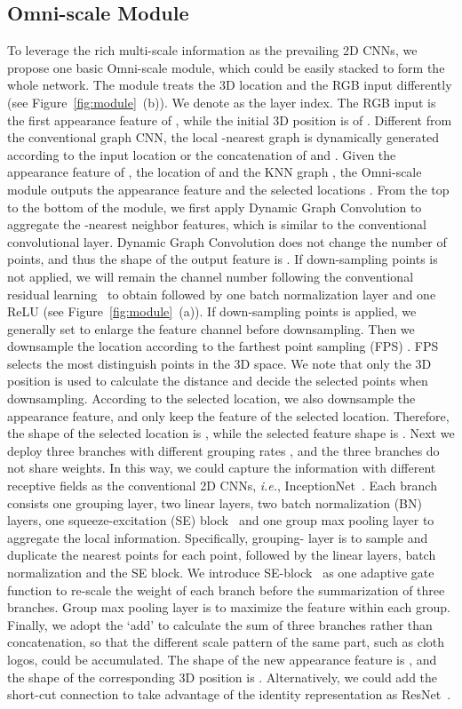 \documentclass[journal]{IEEEtran}
\def\ie{\emph{i.e.}}
\begin{document}
\subsection{Omni-scale Module}
To leverage the rich multi-scale information as the prevailing 2D CNNs, we propose one basic Omni-scale module, which could be easily stacked to form the whole network. The module treats the 3D location and the RGB input differently (see Figure~\ref{fig:module}~(b)). 
We denote  as the layer index. The RGB input is the first appearance feature  of , while the initial 3D position is  of . Different from the conventional graph CNN, the local -nearest graph  is dynamically generated according to the input location  or the concatenation of  and . Given the appearance feature  of , the location  of  and the KNN graph , the Omni-scale module outputs the appearance feature  and the selected locations . 
From the top to the bottom of the module, we first apply Dynamic Graph Convolution to aggregate the -nearest neighbor features, which is similar to the conventional convolutional layer. Dynamic Graph Convolution does not change the number of points, and thus the shape of the output feature is . 
If down-sampling points is not applied, we will remain the channel number  following the conventional residual learning~\cite{he2016deep}  to obtain  followed by one batch normalization layer and one ReLU (see Figure~\ref{fig:module}~(a)). 
If down-sampling points is applied, we generally set  to enlarge the feature channel before downsampling. Then we downsample the location according to the farthest point sampling (FPS) \cite{qi2017pointnet++}. FPS selects the most distinguish points in the 3D space. We note that only the 3D position  is used to calculate the distance and decide the selected points when downsampling. According to the selected location, we also downsample the appearance feature, and only keep the feature of the selected location. Therefore, the shape of the selected location is , while the selected feature shape is . 
Next we deploy three branches with different grouping rates , and the three branches do not share weights. In this way, we could capture the information with different receptive fields as the conventional 2D CNNs, \ie, InceptionNet~\cite{szegedy2017inception}. Each branch consists one grouping layer, two linear layers, two batch normalization (BN) layers, one squeeze-excitation (SE) block~\cite{hu2018squeeze} and one group max pooling layer to aggregate the local information. 
Specifically, grouping- layer is to sample and duplicate the  nearest points for each point, followed by the linear layers, batch normalization and the SE block. We introduce SE-block~\cite{hu2018squeeze} as one adaptive gate function to re-scale the weight of each branch before the summarization of three branches. Group max pooling layer is to maximize the feature within each group. Finally, we adopt the `add' to calculate the sum of three branches rather than concatenation, so that the different scale pattern of the same part, such as cloth logos, could be accumulated. The shape of the new appearance feature  is , and the shape of the corresponding 3D position  is . Alternatively, we could add the short-cut connection to take advantage of the identity representation as ResNet~\cite{he2016deep}. 
\end{document}
